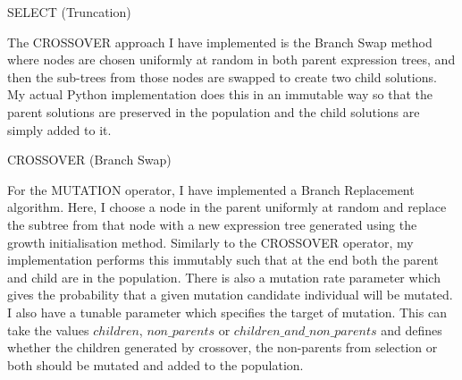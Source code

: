 \documentclass[11pt]{article}
\begin{document}
\begin{algorithm}[ht]
  \caption{SELECT (Truncation)}
  \label{alg:sel}
  \DontPrintSemicolon
\end{algorithm}

The CROSSOVER approach I have implemented is the Branch Swap method where nodes are chosen uniformly at random in both parent expression trees, and then the sub-trees from those nodes are swapped to create two child solutions.
My actual Python implementation does this in an immutable way so that the parent solutions are preserved in the population and the child solutions are simply added to it.

\begin{algorithm}[ht]
  \caption{CROSSOVER (Branch Swap)}
  \label{alg:cross}
  \DontPrintSemicolon
\end{algorithm}

For the MUTATION operator, I have implemented a Branch Replacement algorithm.
Here, I choose a node in the parent uniformly at random and replace the subtree from that node with a new expression tree generated using the growth initialisation method.
Similarly to the CROSSOVER operator, my implementation performs this immutably such that at the end both the parent and child are in the population.
There is also a mutation rate parameter which gives the probability that a given mutation candidate individual will be mutated.
I also have a tunable parameter which specifies the target of mutation.
This can take the values $children$, $non\_parents$ or $children\_and\_non\_parents$ and defines whether the children generated by crossover, the non-parents from selection or both should be mutated and added to the population.
\end{document}
